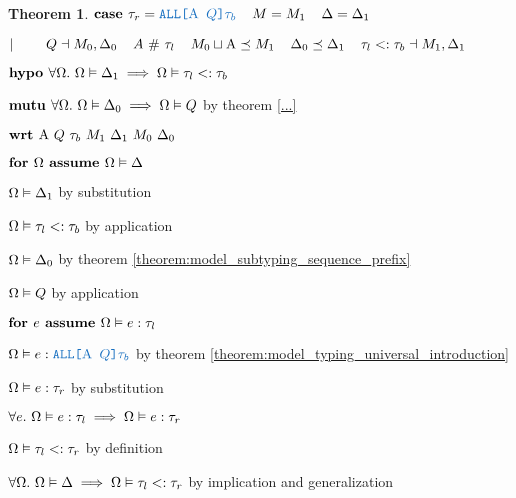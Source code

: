 \documentclass[acmsmall]{acmart}
\theoremstyle{definition}
\newtheorem{theorem}{Theorem}[section]
\begin{document}
\begin{theorem}
    \item \Z $\B{case } 
      \tau_r = \obj{ALL[$\Alpha$ $Q$]$\tau_b$}
      \I
      M = M_1
      \I
      \Delta = \Delta_1
    $
    \item \Z $|\ \ \ \ \ \ \ 
      Q \dashv M_0, \Delta_0
      \hspace{4mm}
      A\ \#\ \tau_l
      \hspace{4mm}
      M_0 \sqcup \mathrm{A} \preceq M_1
      \hspace{4mm}
      \Delta_0 \preceq \Delta_1
      \hspace{4mm}
      \tau_l <: \tau_b
      \dashv M_1, \Delta_1
    $
    \item \Z $\textbf{hypo } 
      \forall \Omega .\ \Omega \vDash \Delta_1 \implies \Omega \vDash \tau_l <: \tau_b 
    $
    \item \Z $\textbf{mutu } 
      \forall \Omega .\ \Omega \vDash \Delta_0 \implies \Omega \vDash Q 
    $ by theorem \ref{...} 
    \item \Z $\B{wrt } \Alpha\ Q\ \tau_b\ M_1\ \Delta_1\ M_0\ \Delta_0$
      \item \Z\Z $\textbf{for } \Omega \textbf{ assume } \Omega \vDash \Delta$
        \item \Z\Z\Z $\Omega \vDash \Delta_1$ by substitution 
        \item \Z\Z\Z $\Omega \vDash \tau_l <: \tau_b$ by application 
        \item \Z\Z\Z $\Omega \vDash \Delta_0$ by theorem \ref{theorem:model_subtyping_sequence_prefix} 
        \item \Z\Z\Z $\Omega \vDash Q$ by application 
        \item \Z\Z\Z $\textbf{for } e \textbf{ assume } \Omega \vDash e : \tau_l$ 
          \item \Z\Z\Z\Z $\Omega \satisfies e \hastype \obj{ALL[$\Alpha$ $Q$]$\tau_b$}$ by theorem \ref{theorem:model_typing_universal_introduction} 
          \item \Z\Z\Z\Z $\Omega \vDash e : \tau_r$ by substitution 
        \item \Z\Z\Z $\forall e .\ \Omega \vDash e : \tau_l 
          \implies \Omega \vDash e : \tau_r
        $ 
        \item \Z\Z\Z $\Omega \vDash \tau_l <: \tau_r$ by definition 
      \item \Z\Z $\forall \Omega .\ \Omega \vDash \Delta \implies \Omega \vDash \tau_l <: \tau_r$ 
      by implication and generalization
      \item \Z\Z {} 


\end{theorem}
\end{document}
